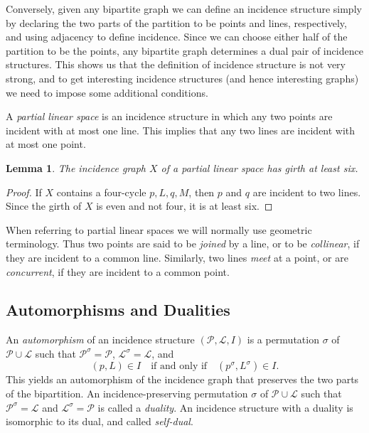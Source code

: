 \documentclass[12pt,a4paper,openany]{book}
\newtheorem{lemma}{Lemma}[section]
\begin{document}
Conversely, given any bipartite graph we can define an incidence structure simply by declaring the two parts of the partition to be points and lines, respectively, and using adjacency to define incidence. Since we can choose either half of the partition to be the points, any bipartite graph determines a dual pair of incidence structures. This shows us that the definition of incidence structure is not very strong, and to get interesting incidence structures (and hence interesting graphs) we need to impose some additional conditions.

A \emph{partial linear space} is an incidence structure in which any two points are incident with at most one line. This implies that any two lines are incident with at most one point.

\begin{lemma}\label{lem:partial-linear-girth}
The incidence graph $X$ of a partial linear space has girth at least six.
\end{lemma}
\begin{proof}
If $X$ contains a four-cycle $p, L, q, M$, then $p$ and $q$ are incident to two lines. Since the girth of $X$ is even and not four, it is at least six.
\end{proof}

When referring to partial linear spaces we will normally use geometric terminology. Thus two points are said to be \emph{joined} by a line, or to be \emph{collinear}, if they are incident to a common line. Similarly, two lines \emph{meet} at a point, or are \emph{concurrent}, if they are incident to a common point.

\subsection*{Automorphisms and Dualities}
An \emph{automorphism} of an incidence structure $(\mathcal{P}, \mathcal{L}, I)$ is a permutation $\sigma$ of $\mathcal{P} \cup \mathcal{L}$ such that $\mathcal{P}^\sigma = \mathcal{P}$, $\mathcal{L}^\sigma = \mathcal{L}$, and
\[
(p, L) \in I \quad \text{if and only if} \quad (p^\sigma, L^\sigma) \in I.
\]
This yields an automorphism of the incidence graph that preserves the two parts of the bipartition. An incidence-preserving permutation $\sigma$ of $\mathcal{P} \cup \mathcal{L}$ such that $\mathcal{P}^\sigma = \mathcal{L}$ and $\mathcal{L}^\sigma = \mathcal{P}$ is called a \emph{duality}. An incidence structure with a duality is isomorphic to its dual, and called \emph{self-dual}.
\end{document}
